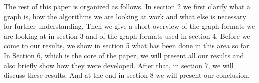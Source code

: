 The rest of this paper is organized as follows.
In section 2 we first clarify what a graph is, how the algorithms we are looking at work and what else is necessary for further understanding. Then we give a short overview of the graph formats we are looking at in section 3 and of the graph formats used in section 4. Before we come to our results, we show in section 5 what has been done in this area so far. In Section 6, which is the core of the paper, we will present all our results and also briefly show how they were developed. After that, in section 7, we will discuss these results. And at the end in section 8 we will present our conclusion.
